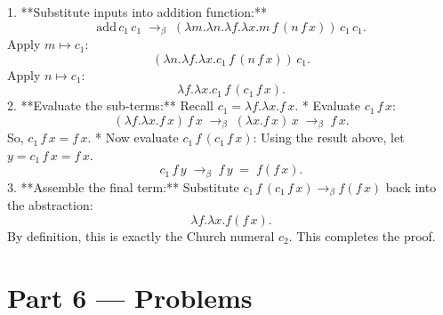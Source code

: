 \documentclass[12pt, a4paper]{book}
\begin{document}
\begin{problembox}
\begin{enumerate}[label=\textbf{E\arabic*.}]
        1. **Substitute inputs into addition function:**
           \[
             \text{add} \, c_1 \, c_1 \;\to_\beta\; \left( \lambda m. \lambda n. \lambda f. \lambda x. m \, f \, (n \, f \, x) \right) \, c_1 \, c_1.
           \]
           Apply $m \mapsto c_1$:
           \[
             \left( \lambda n. \lambda f. \lambda x. c_1 \, f \, (n \, f \, x) \right) \, c_1.
           \]
           Apply $n \mapsto c_1$:
           \[
             \lambda f. \lambda x. c_1 \, f \, (c_1 \, f \, x).
           \]
        2. **Evaluate the sub-terms:**
           Recall $c_1 = \lambda f. \lambda x. f \, x$.
           * Evaluate $c_1 \, f \, x$:
             \[
               (\lambda f. \lambda x. f \, x) \, f \, x \;\to_\beta\; (\lambda x. f \, x) \, x \;\to_\beta\; f \, x.
             \]
             So, $c_1 \, f \, x = f \, x$.
           * Now evaluate $c_1 \, f \, (c_1 \, f \, x)$:
             Using the result above, let $y = c_1 \, f \, x = f \, x$.
             \[
               c_1 \, f \, y \;\to_\beta\; f \, y \;=\; f (f \, x).
             \]
        3. **Assemble the final term:**
           Substitute $c_1 \, f \, (c_1 \, f \, x) \to_\beta f (f \, x)$ back into the abstraction:
           \[
             \lambda f. \lambda x. f (f \, x).
           \]
        By definition, this is exactly the Church numeral $c_2$.
        This completes the proof.
\end{enumerate}
\end{problembox}

\newpage

\section{Part 6 --- Problems}
\end{document}
